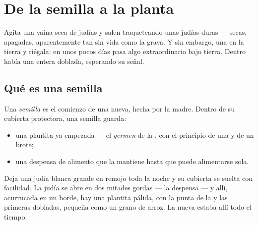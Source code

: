 \chapter{De la semilla a la planta}\label{ch:g2:from-seed-to-plant}

Agita una vaina seca de judías y salen traqueteando unas judías duras
--- secas, apagadas, aparentemente tan sin vida como la grava. Y sin
embargo,  una en la tierra y riégala: en unos pocos días pasa
algo extraordinario bajo tierra. Dentro había una  entera
doblada, esperando su señal.

\section{Qué es una semilla}

\begin{definition}[Semilla]\label{def:g2:from-seed-to-plant:seed}
Una \emph{semilla} es el comienzo de una  nueva,
hecha por la  madre. Dentro de su cubierta protectora, una
semilla guarda:
\begin{itemize}
  \item una plantita ya empezada --- el \emph{germen}
de la , con el principio de una  y de
        un brote;
  \item una despensa de alimento que la mantiene hasta que puede
        alimentarse sola.
\end{itemize}
\end{definition}

\begin{example}\label{ex:g2:from-seed-to-plant:open}
Deja una judía blanca grande en remojo toda la noche y su cubierta se
suelta con facilidad. La judía se abre en dos mitades gordas --- la
despensa --- y allí, acurrucada en un borde, hay una plantita pálida,
con la punta de la  y las primeras  dobladas, pequeña como un
grano de arroz. La  nueva estaba allí todo el tiempo.
\end{example}

